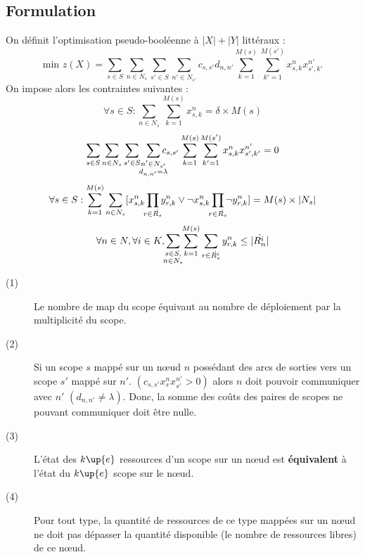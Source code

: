\documentclass[11pt,a4paper]{article} %
\begin{document}
\subsection{Formulation}
On définit l'optimisation pseudo-booléenne à $|X|+|Y|$ littéraux :
\[
	\mbox{min }z(X) = \sum_{s \in S}\sum_{n \in N_s}\sum_{s' \in S}\sum_{n' \in N_{s'}}c_{s,s'} d_{n,n'}\sum_{k=1}^{M(s)}\sum_{k'=1}^{M(s')}x_{s,k}^n x_{s',k'}^{n'}
\]
On impose alors les contraintes suivantes :
\begin{equation}
\forall s \in S : \sum_{n \in N_s}\sum_{k=1}^{M(s)}x_{s,k}^n= \delta \times M(s)
\end{equation}
\begin{equation}
\sum_{s \in S}\sum_{n \in N_s}\sum_{s' \in S}\hspace{1ex}\smashoperator{\sum_{\substack{n' \in N_{s'} \\ d_{n,n'}=\lambda}}}{c_{s,s'} \sum_{k=1}^{M(s)}\sum_{k'=1}^{M(s')}x_{s,k}^n x_{s',k'}^{n'}} = 0
\end{equation}
\begin{equation}
\forall s \in S : \sum_{k=1}^{M(s)}\sum_{n \in N_s}[x_{s,k}^n \smashoperator{\prod_{r \in \dot{R_s}}} y_{r,k}^n \vee \neg x_{s,k}^n\smashoperator{\prod_{r \in \dot{R_s}}} \neg y_{r,k}^n] = M(s) \times |N_s|
\end{equation}
\begin{equation}
\forall n \in N, \forall i \in K, \smashoperator{\sum_{\substack{s \in S,\\n \in N_s}}}\sum_{k=1}^{M(s)}\sum_{r \in \dot{R_s^i}} y_{r,k}^n \leq |\dot{R_n^i}|
\end{equation}

\begin{description}
\item[(1)] Le nombre de map du scope équivaut au nombre de déploiement par la multiplicité du scope.
\item[(2)] Si un scope $s$ mappé sur un nœud $n$ possédant des arcs de sorties vers un scope $s'$ mappé sur $n'$. $({c_{s,s'} x_s^n  x_{s'}^{n'}}>0)$ alors $n$ doit pouvoir communiquer avec $n'$ $(d_{n,n'} \neq \lambda)$. Donc, la somme des coûts des paires de scopes ne pouvant communiquer doit être nulle.
\item[(3)] L'état des $k\up{e}$ ressources d'un scope sur un nœud est \textbf{équivalent} à l'état du $k\up{e}$ scope sur le nœud.
\item[(4)] Pour tout type, la quantité de ressources de ce type mappées sur un nœud ne doit pas dépasser la quantité disponible (le nombre de ressources libres) de ce nœud.
\end{description}
\end{document}
